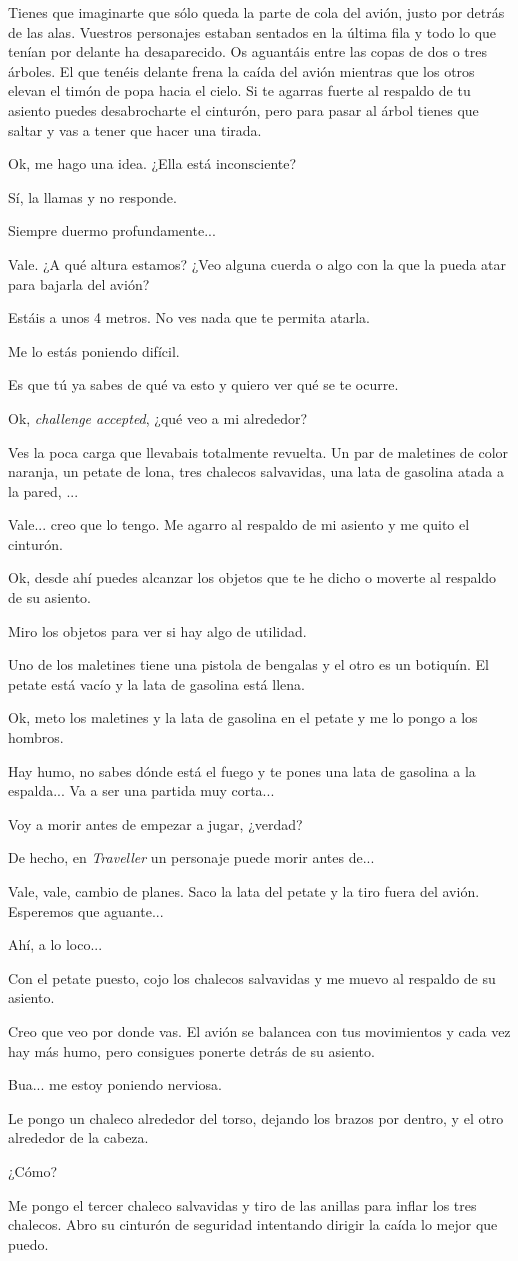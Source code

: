 \documentclass[10pt, a5paper, twocolumn]{article}
\newenvironment{dialogue}
    {\begin{description}[leftmargin=!,align=right,labelwidth=0.cm]}
    {\end{description}}
\newcommand\A{\item[\raisebox{-0.25em}{\scalebox{0.75}{\bctetraedre}}]}
\newcommand\B{\item[\raisebox{-0.25em}{\scalebox{0.75}{\bccube}}]}
\newcommand\E{\item[\raisebox{-0.25em}{\scalebox{0.75}{\bcicosaedre}}]}
\begin{document}
\begin{dialogue}
        \E Tienes que imaginarte que sólo queda la parte de cola del avión, justo por detrás de las alas. Vuestros personajes estaban sentados en la última fila y todo lo que tenían por delante ha desaparecido. Os aguantáis entre las copas de dos o tres árboles. El que tenéis delante frena la caída del avión mientras que los otros elevan el timón de popa hacia el cielo. Si te agarras fuerte al respaldo de tu asiento puedes desabrocharte el cinturón, pero para pasar al árbol tienes que saltar y vas a tener que hacer una tirada.
        \B Ok, me hago una idea. ¿Ella está inconsciente?
        \E Sí, la llamas y no responde.
        \A Siempre duermo profundamente...
        \B Vale. ¿A qué altura estamos? ¿Veo alguna cuerda o algo con la que la pueda atar para bajarla del avión?
        \E Estáis a unos 4 metros. No ves nada que te permita atarla.
        \B Me lo estás poniendo difícil.
        \E Es que tú ya sabes de qué va esto y quiero ver qué se te ocurre.
        \B Ok, \emph{challenge accepted}, ¿qué veo a mi alrededor?
        \E Ves la poca carga que llevabais totalmente revuelta. Un par de maletines de color naranja, un petate de lona, tres chalecos salvavidas, una lata de gasolina atada a la pared, ...
        \B Vale... creo que lo tengo. Me agarro al respaldo de mi asiento y me quito el cinturón.
        \E Ok, desde ahí puedes alcanzar los objetos que te he dicho o moverte al respaldo de su asiento.
        \B Miro los objetos para ver si hay algo de utilidad.
        \E Uno de los maletines tiene una pistola de bengalas y el otro es un botiquín. El petate está vacío y la lata de gasolina está llena.
        \B Ok, meto los maletines y la lata de gasolina en el petate y me lo pongo a los hombros.
        \E Hay humo, no sabes dónde está el fuego y te pones una lata de gasolina a la espalda... Va a ser una partida muy corta...
        \A Voy a morir antes de empezar a jugar, ¿verdad?
        \E De hecho, en \emph{Traveller} un personaje puede morir antes de...
        \B Vale, vale, cambio de planes. Saco la lata del petate y la tiro fuera del avión. Esperemos que aguante...
        \E Ahí, a lo loco...
        \B Con el petate puesto, cojo los chalecos salvavidas y me muevo al respaldo de su asiento.
        \E Creo que veo por donde vas. El avión se balancea con tus movimientos y cada vez hay más humo, pero consigues ponerte detrás de su asiento.
        \A Bua... me estoy poniendo nerviosa.
        \B Le pongo un chaleco alrededor del torso, dejando los brazos por dentro, y el otro alrededor de la cabeza.
        \A ¿Cómo?
        \B Me pongo el tercer chaleco salvavidas y tiro de las anillas para inflar los tres chalecos. Abro su cinturón de seguridad intentando dirigir la caída lo mejor que puedo.

\end{dialogue}
\end{document}

